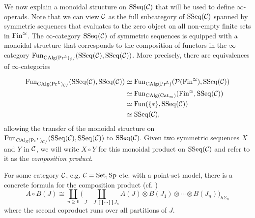 %



We now explain a monoidal structure on $\operatorname{SSeq}({\mathcal{C}})$ that will be used to define $\infty$-operads. Note that we can view ${\mathcal{C}}$ as the full subcategory of $\operatorname{SSeq}({\mathcal{C}})$ spanned by symmetric sequences that evaluates to the zero object on all non-empty finite sets in $\operatorname{Fin}^{\simeq}$. 
The $\infty$-category $\operatorname{SSeq}({\mathcal{C}})$ of symmetric sequences is equipped with a monoidal structure that corresponds to the composition of functors in the $\infty$-category $\operatorname{Fun}_{\operatorname{CAlg}(\Pr^L)_{{\mathcal{C}}/}}(\operatorname{SSeq}({\mathcal{C}}),\operatorname{SSeq}({\mathcal{C}}))$. More precisely, there are equivalences of $\infty$-categories

\begin{align*}
    	\operatorname{Fun}_{\operatorname{CAlg}(\Pr^L)_{{\mathcal{C}}/}}(\operatorname{SSeq}({\mathcal{C}}),\operatorname{SSeq}({\mathcal{C}}))
	& \simeq 
\operatorname{Fun}_{\operatorname{CAlg}(\Pr^L)}({\mathcal{P}}(\operatorname{Fin}^{\simeq}),\operatorname{SSeq}({\mathcal{C}}))\\
& \simeq
\operatorname{Fun}_{\operatorname{CAlg}(\operatorname{Cat}_{\infty})}(\operatorname{Fin}^{\simeq},\operatorname{SSeq}({\mathcal{C}}))\\
& \simeq \operatorname{Fun}(\{*\}, \operatorname{SSeq}({\mathcal{C}}))\\
& \simeq \operatorname{SSeq}({\mathcal{C}}),
\end{align*}
allowing the transfer of the monoidal structure on $\operatorname{Fun}_{\operatorname{CAlg}(\Pr^L)_{{\mathcal{C}}/}}(\operatorname{SSeq}({\mathcal{C}}),\operatorname{SSeq}({\mathcal{C}}))$ to $\operatorname{SSeq}({\mathcal{C}})$.
Given two symmetric sequences $X$ and $Y$ in ${\mathcal{C}}$, we will write $X\circ Y$ for this monoidal product on $\operatorname{SSeq}({\mathcal{C}})$ and refer to it as the \emph{composition product}.


\begin{remark}
\label{formula for composition product}
For some category ${\mathcal{C}}$, e.g. ${\mathcal{C}}=\operatorname{Set}, \operatorname{Sp}$ etc. with a point-set model, there is a concrete formula for the composition product (cf. \cite[Section 4.1.2.]{BrantnerPhD})
$$
A\circ B (J) \cong \coprod_{n\geq 0} \big(
\coprod_{J = J_1 \coprod \cdots \coprod J_n} A(J) \otimes 
B(J_1)\otimes \cdots \otimes B(J_n)
\big)_{h\Sigma_n}
$$
where the second coproduct runs over all partitions of $J$. 
\end{remark}

